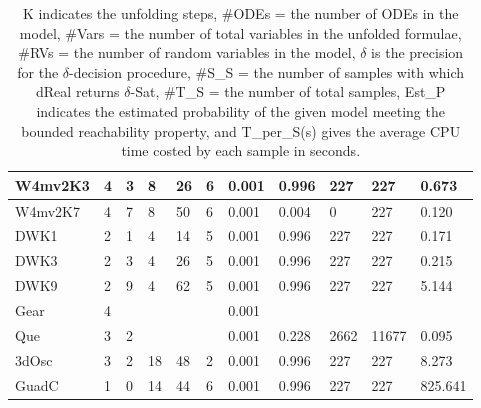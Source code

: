 \begin{table}[h]
\begin{tabular}{|l|l|l|l|l|l|l|l|l|l|l|}
    W4mv2K3       & 4       & 3 & 8      & 26     & 6     & 0.001 & 0.996      & 227         & 227        & 0.673          \\ \hline
    W4mv2K7       & 4       & 7 & 8      & 50     & 6     & 0.001 & 0.004     & 0         & 227        & 0.120               \\ \hline
    DWK1      & 2       & 1 & 4      & 14    & 5     & 0.001 & 0.996  & 227       & 227      & 0.171           \\ \hline
    DWK3      & 2       & 3 & 4      & 26    & 5     & 0.001 & 0.996  & 227       & 227      & 0.215           \\ \hline
    DWK9      & 2       & 9 & 4      & 62    & 5     & 0.001 & 0.996  & 227       & 227      & 5.144           \\ \hline
    Gear      & 4       & ~ & ~      & ~     & ~     & 0.001 & ~      & ~         & ~        & ~               \\ \hline
    Que       & 3       & 2 & ~      & ~     & ~     & 0.001 & 0.228      & 2662         & 11677        & 0.095       \\ \hline
    3dOsc     & 3       & 2 & 18      & 48     & 2     & 0.001 & 0.996      & 227         & 227        & 8.273      \\ \hline
    GuadC     & 1       & 0 & 14      & 44     & 6     & 0.001 & 0.996      & 227         & 227        & 825.641     \\ \hline
    \end{tabular}
    \caption {K indicates the unfolding steps, \#ODEs = the number of ODEs in the model, \#Vars = the number of total variables in the unfolded formulae, \#RVs = the number of random variables in the model, $\delta$ is the precision for the $\delta$-decision procedure, \#S\_S = the number of samples with which dReal returns $\delta$-Sat, \#T\_S = the number of total samples, Est\_P indicates the estimated probability of the given model meeting the bounded reachability property, and T\_per\_S(s) gives the average CPU time costed by each sample in seconds.}
    \label{table:exp}
\end{table}